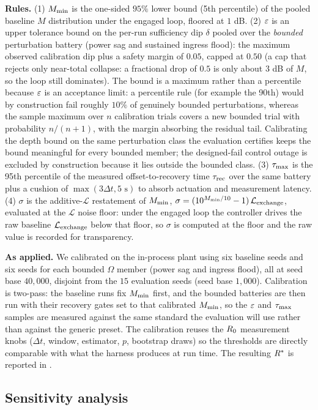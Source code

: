 \documentclass[11pt]{article}
\begin{document}
\textbf{Rules.} (1) $M_{\min}$ is the one-sided $95\%$ lower bound (5th percentile) of the pooled baseline $M$ distribution under the engaged loop, floored at $1$ dB. (2) $\varepsilon$ is an upper tolerance bound on the per-run sufficiency dip $\delta$ pooled over the \emph{bounded} perturbation battery (power sag and sustained ingress flood): the maximum observed calibration dip plus a safety margin of $0.05$, capped at $0.50$ (a cap that rejects only near-total collapse: a fractional drop of $0.5$ is only about $3$ dB of $M$, so the loop still dominates). The bound is a maximum rather than a percentile because $\varepsilon$ is an acceptance limit: a percentile rule (for example the 90th) would by construction fail roughly $10\%$ of genuinely bounded perturbations, whereas the sample maximum over $n$ calibration trials covers a new bounded trial with probability $n/(n+1)$, with the margin absorbing the residual tail. Calibrating the depth bound on the same perturbation class the evaluation certifies keeps the bound meaningful for every bounded member; the designed-fail control outage is excluded by construction because it lies outside the bounded class. (3) $\tau_{\max}$ is the 95th percentile of the measured offset-to-recovery time $\tau_{\text{rec}}$ over the same battery plus a cushion of $\max(3\Delta t, 5\text{ s})$ to absorb actuation and measurement latency. (4) $\sigma$ is the additive-$\mathcal{L}$ restatement of $M_{\min}$, $\sigma = (10^{M_{\min}/10} - 1)\,\mathcal{L}_{\text{exchange}}$, evaluated at the $\mathcal{L}$ noise floor: under the engaged loop the controller drives the raw baseline $\mathcal{L}_{\text{exchange}}$ below that floor, so $\sigma$ is computed at the floor and the raw value is recorded for transparency.

\textbf{As applied.} We calibrated on the in-process plant using six baseline seeds and six seeds for each bounded $\Omega$ member (power sag and ingress flood), all at seed base $40{,}000$, disjoint from the $15$ evaluation seeds (seed base $1{,}000$). Calibration is two-pass: the baseline runs fix $M_{\min}$ first, and the bounded batteries are then run with their recovery gates set to that calibrated $M_{\min}$, so the $\varepsilon$ and $\tau_{\max}$ samples are measured against the same standard the evaluation will use rather than against the generic preset. The calibration reuses the $R_0$ measurement knobs ($\Delta t$, window, estimator, $p$, bootstrap draws) so the thresholds are directly comparable with what the harness produces at run time. The resulting $R^*$ is reported in .

\subsection{Sensitivity analysis}
\label{sec:methods_sensitivity}
\end{document}
